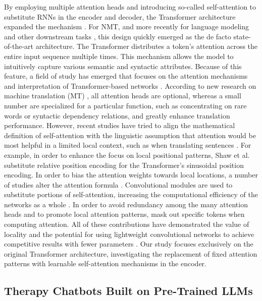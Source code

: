 By employing multiple attention heads and introducing so-called self-attention to substitute RNNs in the encoder and decoder, the Transformer architecture expanded the mechanism \cite{Vaswani2017}. For NMT, and more recently for language modeling \cite{Radford2018} and other downstream tasks \cite{Strubell2018}, this design quickly emerged as the de facto state-of-the-art architecture. The Transformer distributes a token's attention across the entire input sequence multiple times. This mechanism allows the model to intuitively capture various semantic and syntactic attributes. Because of this feature, a field of study has emerged that focuses on the attention mechanisms and interpretation of Transformer-based networks \cite{Raganato2018}. According to new research on machine translation (MT) \cite{Voita2019b}, all attention heads are optional, whereas a small number are specialized for a particular function, such as concentrating on rare words or syntactic dependency relations, and greatly enhance translation performance. However, recent studies have tried to align the mathematical definition of self-attention with the linguistic assumption that attention would be most helpful in a limited local context, such as when translating sentences \cite{Hao2019a}. For example, in order to enhance the focus on local positional patterns, Shaw et al. \cite{Shaw2018} substitute relative position encoding for the Transformer's sinusoidal position encoding. In order to bias the attention weights towards local locations, a number of studies alter the attention formula \cite{Yang2018}. Convolutional modules are used to substitute portions of self-attention, increasing the computational efficiency of the networks as a whole \cite{Wu2019}. In order to avoid redundancy among the many attention heads and to promote local attention patterns, \cite{Cui2019} mask out specific tokens when computing attention. All of these contributions have demonstrated the value of locality and the potential for using lightweight convolutional networks to achieve competitive results with fewer parameters \cite{Wu2019}. Our study focuses exclusively on the original Transformer architecture, investigating the replacement of fixed attention patterns with learnable self-attention mechanisms in the encoder.

\subsection{Therapy Chatbots Built on Pre-Trained LLMs} 

